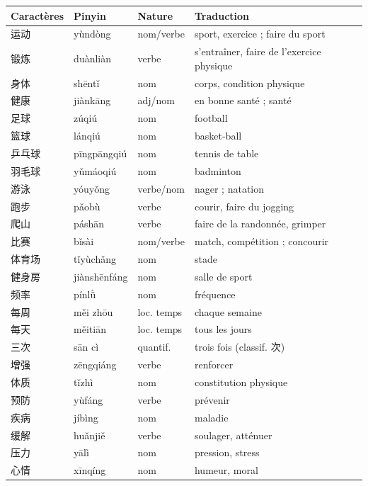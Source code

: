 \documentclass[11pt]{article}
\newcommand{\cle}[1]{{\popxbold\color{popdark}#1}}
\begin{document}
\begin{center}
\begin{tabularx}{\linewidth}{|X|X|X|X|}
\hline
\rowcolor{popblueL} \textbf{Caractères} & \textbf{Pinyin} & \textbf{Nature} & \textbf{Traduction} \\ \hline
运动 & yùndòng & nom/verbe & sport, exercice ; faire du sport \\ \hline
锻炼 & duànliàn & verbe & s'entraîner, faire de l'exercice physique \\ \hline
身体 & shēntǐ & nom & corps, condition physique \\ \hline
健康 & jiànkāng & adj/nom & en bonne santé ; santé \\ \hline
足球 & zúqiú & nom & football \\ \hline
篮球 & lánqiú & nom & basket-ball \\ \hline
乒乓球 & pīngpāngqiú & nom & tennis de table \\ \hline
羽毛球 & yǔmáoqiú & nom & badminton \\ \hline
游泳 & yóuyǒng & verbe/nom & nager ; natation \\ \hline
跑步 & pǎobù & verbe & courir, faire du jogging \\ \hline
爬山 & páshān & verbe & faire de la randonnée, grimper \\ \hline
比赛 & bǐsài & nom/verbe & match, compétition ; concourir \\ \hline
体育场 & tǐyùchǎng & nom & stade \\ \hline
健身房 & jiànshēnfáng & nom & salle de sport \\ \hline
频率 & pínlǜ & nom & fréquence \\ \hline
每周 & měi zhōu & loc. temps & chaque semaine \\ \hline
每天 & měitiān & loc. temps & tous les jours \\ \hline
三次 & sān cì & quantif. & trois fois (classif. \cle{次}) \\ \hline
增强 & zēngqiáng & verbe & renforcer \\ \hline
体质 & tǐzhì & nom & constitution physique \\ \hline
预防 & yùfáng & verbe & prévenir \\ \hline
疾病 & jíbìng & nom & maladie \\ \hline
缓解 & huǎnjiě & verbe & soulager, atténuer \\ \hline
压力 & yālì & nom & pression, stress \\ \hline
心情 & xīnqíng & nom & humeur, moral \\ \hline

\end{tabularx}
\end{center}
\end{document}

